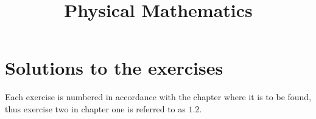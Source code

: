 \documentclass[11pt,twoside,openright]{memoir}
\title{Physical Mathematics}
\begin{document}
\let\cleardoublepage\clearpage
\maketitle

\tableofcontents
{}


\mainmatter



\appendix
\chapter{Solutions to the exercises}
Each exercise is numbered in accordance with the chapter where it is to be found, thus exercise two in chapter one is referred to as $1.2$.
\shipoutAnswer

\backmatter
\printindex
\end{document}
